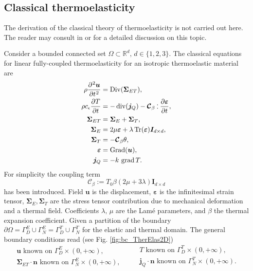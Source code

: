 \subsection{Classical thermoelasticity}\label{sec:classTherElas}
The derivation of the classical theory of thermoelasticity is not carried out here. The reader may consult in \cite[Chapter 1]{hetnarski2009thermal} or \cite[Chapter 8]{abeyaratne2012notes} for a detailed discussion on this topic. 

Consider a bounded connected set $\Omega \subset \mathbb{R}^d, \, d \in \{1,2,3\}$. The classical equations for linear fully-coupled thermoelasticity for an isotropic thermoelastic material are \cite{biot1956thermoelasticity,carlson1973}
\begin{equation}\label{eq:sysThElas}
\begin{aligned}
\displaystyle \rho \diffp[2]{\bm{u}}{t} &= \Div(\bm{\Sigma}_{ET}) , \\
\displaystyle \rho c_\epsilon \diffp{T}{t} &= -\div(\bm{j}_Q) - \bm{\mathcal{C}}_\beta \cddot \displaystyle\diffp{\bm{\varepsilon}}{t}, \\
\bm{\Sigma}_{ET} &= \bm{\Sigma}_E + \bm{\Sigma}_{T}, \\
\bm{\Sigma}_E &= 2\mu \bm{\varepsilon} + \lambda \Tr(\bm{\varepsilon}) \bm{I}_{d\times d}, \\
\bm{\Sigma}_T &= - \bm{\mathcal{C}}_\beta \theta,  \\
\bm{\varepsilon} &= \Grad(\bm{u}), \\
\bm{j}_Q &= -k \, \grad T.
\end{aligned}
\end{equation}
For simplicity  the coupling term
\[\bm{\mathcal{C}}_\beta:=T_0 \beta(2\mu + 3 \lambda)\bm{I}_{d\times d} \]
has been introduced. Field $\bm{u}$ is the displacement, $\bm{\varepsilon}$ is the infinitesimal strain tensor, $\bm{\Sigma}_E, \bm{\Sigma}_T$ are the stress tensor contribution due to mechanical deformation and a thermal field. Coefficients $\lambda,\, \mu$ are the Lam\'e parameters,  and $\beta$ the thermal expansion coefficient. Given a partition of the boundary $\partial \Omega = \Gamma_D^E \cup \Gamma_N^E = \Gamma_D^T \cup \Gamma_N^T$ for the elastic and thermal domain. The general boundary conditions read (see Fig. \ref{fig:bc_TherElas2D})
\begin{equation}
\begin{aligned}
\bm{u} \text{ known on } \Gamma_D^E \times (0, +\infty), \\
\bm{\Sigma}_{ET} \cdot \bm{n} \text{ known on } \Gamma_N^E \times (0, +\infty), 
\end{aligned} \qquad
\begin{aligned}
T \text{ known on } \Gamma_D^T \times (0, +\infty), \\
\bm{j}_Q \cdot \bm{n} \text{ known on } \Gamma_N^T \times (0, +\infty).
\end{aligned}
\end{equation}
